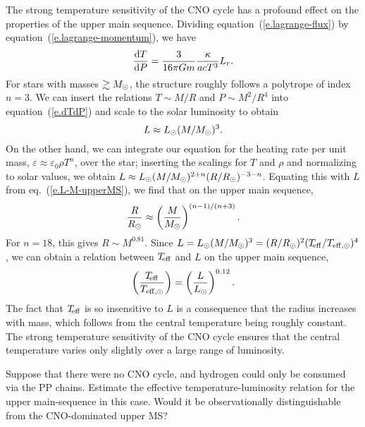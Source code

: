 The strong temperature sensitivity of the CNO cycle has a profound effect on the properties of the upper main sequence.  Dividing equation~(\ref{e.lagrange-flux}) by equation~(\ref{e.lagrange-momentum}), we have
\begin{equation}\label{e.dTdP}
 \frac{\mathrm{d} T}{\mathrm{d} P} = \frac{3}{16\pi Gm}\frac{\kappa}{ac T^{3}}L_{r}.
\end{equation}
For stars with masses $\gtrsim M_\odot$, the structure roughly follows a polytrope of index $n=3$.  We can insert the relations $T\sim M/R$ and $P\sim M^{2}/R^{4}$ into equation~(\ref{e.dTdP}) and scale to the solar luminosity to obtain 
\begin{equation}\label{e.L-M-upperMS}
L \approx L_{\odot} (M/M_\odot)^{3}.
\end{equation}
On the other hand, we can integrate our equation for the heating rate per unit mass, $\varepsilon \approx \varepsilon_{0}\rho T^{n}$, over the star; inserting the scalings for $T$ and $\rho$ and normalizing to solar values, we obtain $L\approx L_{\odot} (M/M_\odot)^{2+n}(R/R_{\odot})^{-3-n}$. Equating this with $L$ from eq.~(\ref{e.L-M-upperMS}), we find that on the upper main sequence,
\begin{equation}\label{e.R-M-upperMS}
\frac{R}{R_{\odot}} \approx \left(\frac{M}{M_\odot}\right)^{(n-1)/(n+3)}.
\end{equation}
For $n = 18$, this gives $R\sim M^{0.81}$.  Since $L = L_{\odot}(M/M_\odot)^{3} = (R/R_{\odot})^{2}(T_{\!\mathrm{eff}}/T_{\mathrm{eff,\odot}})^{4}$, we can obtain a relation between $T_{\!\mathrm{eff}}$ and $L$ on the upper main sequence,
\begin{equation}\label{e.Teff-L-upperMS}
\left(\frac{T_{\!\mathrm{eff}}}{T_{\mathrm{eff,\odot}}}\right) = \left(\frac{L}{L_{\odot}}\right)^{0.12}.
\end{equation}
The fact that $T_{\!\mathrm{eff}}$ is so insensitive to $L$ is a consequence that the radius increases with mass, which follows from the central temperature being roughly constant.  The strong temperature sensitivity of the CNO cycle ensures that the central temperature varies only slightly over a large range of luminosity.


\begin{exercisebox}
Suppose that there were no CNO cycle, and hydrogen could only be consumed via the PP chains.  Estimate the effective temperature-luminosity relation for the upper main-sequence in this case.  Would it be observationally distinguishable from the CNO-dominated upper MS?
\end{exercisebox}

